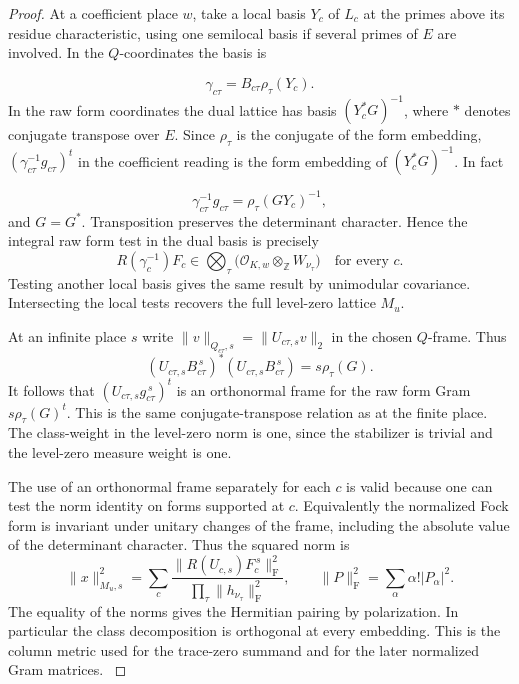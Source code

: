 \begin{proof}

At a coefficient place \(w\), take a local basis \(Y_c\) of
\(L_c\) at the primes above its residue characteristic, using
one semilocal basis if several primes of \(E\) are involved.
In the \(Q\)-coordinates the basis is

\[
  \gamma_{c\tau}=B_{c\tau}\rho_\tau(Y_c).
\]
 In the raw form
coordinates the dual lattice has basis \((Y_c^*G)^{-1}\), where
\(*\) denotes conjugate transpose over \(E\). Since \(\rho_\tau\)
is the conjugate of the form embedding,
\((\gamma_{c\tau}^{-1}g_{c\tau})^t\) in the coefficient reading
is the form embedding of \((Y_c^*G)^{-1}\). In fact

\[
  \gamma_{c\tau}^{-1}g_{c\tau}=\rho_\tau(GY_c)^{-1},
\]
 and
\(G=G^*\). Transposition preserves the determinant character.
Hence the integral raw form test in the dual basis is precisely
\[
  R(\gamma_c^{-1})F_c\in
       \bigotimes_\tau\bigl(\mathcal O_{K,w}\otimes_\mathbb Z
                              W_{\nu_\tau}\bigr)
  \quad\text{for every }c.
\]
Testing another local basis gives the same result by unimodular
covariance. Intersecting the local tests recovers the full
level-zero lattice \(M_u\).


At an infinite place \(s\) write \(\|v\|_{Q_{c\tau},s}
=\|U_{c\tau,s}v\|_2\) in the chosen \(Q\)-frame. Thus
\[
  (U_{c\tau,s}B_{c\tau}^{\,s})^*
     (U_{c\tau,s}B_{c\tau}^{\,s})=s\rho_\tau(G).
\]
It follows that
\((U_{c\tau,s}g_{c\tau}^{\,s})^t\) is an orthonormal frame for
the raw form Gram \(s\rho_\tau(G)^t\). This is the same
conjugate-transpose relation as at the finite place. The
class-weight in the level-zero norm is one, since the stabilizer
is trivial and the level-zero measure weight is one.

The use of
an orthonormal frame separately for each \(c\) is valid because
one can test the norm identity on forms supported at \(c\).
Equivalently the normalized Fock form is invariant under unitary
changes of the frame, including the absolute value of the
determinant character. Thus the squared norm is
\begin{equation}\label{eq:selected-column-gram}
   \|x\|_{M_u,s}^2=
   \sum_c\frac{\|R(U_{c,s})F_c^{\,s}\|_{\mathrm F}^2}
                 {\prod_\tau\|h_{\nu_\tau}\|_{\mathrm F}^2},
   \qquad
   \|P\|_{\mathrm F}^2=\sum_\alpha\alpha!|P_\alpha|^2 .
\end{equation}
The equality of the norms gives the Hermitian pairing by
polarization. In particular the class decomposition is
orthogonal at every embedding. This is the column metric used
for the trace-zero summand and for the later normalized
Gram matrices. \label{cor:selected-column-metric-2}

\end{proof}

